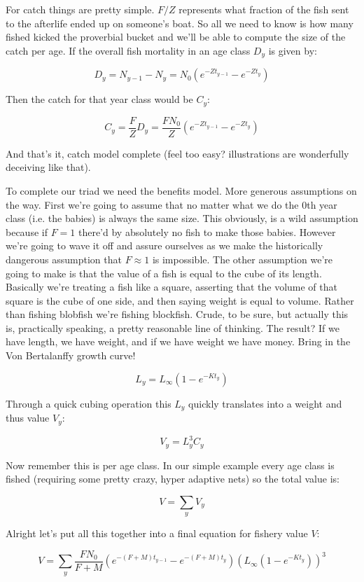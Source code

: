 \documentclass[11pt,a5paper]{book}
\begin{document}
For catch things are pretty simple. $F/Z$ represents what fraction of the fish sent to the afterlife ended up on someone's boat. So all we need to know is how many fished kicked the proverbial bucket and we'll be able to compute the size of the catch per age. If the overall fish mortality in an age class $D_y$ is given by:

$$D_y = N_{y-1} - N_y =N_0(e^{-Zt_{y-1}}- e^{-Zt_y})$$

Then the catch for that year class would be $C_y$:

$$C_y = \frac{F}{Z} D_y = \frac{FN_0}{Z}(e^{-Zt_{y-1}}- e^{-Zt_y})$$

And that's it, catch model complete (feel too easy? illustrations are wonderfully deceiving like that).
\newline

To complete our triad we need the benefits model. More generous assumptions on the way. First we're going to assume that no matter what we do the 0th year class (i.e. the babies) is always the same size. This obviously, is a wild assumption because if $F=1$ there'd by absolutely no fish to make those babies. However we're going to wave it off and assure ourselves as we make the historically dangerous assumption that $F\approx 1$ is impossible. The other assumption we're going to make is that the value of a fish is equal to the cube of its length. Basically we're treating a fish like a square, asserting that the volume of that square is the cube of one side, and then saying weight is equal to volume. Rather than fishing blobfish we're fishing blockfish. Crude, to be sure, but actually this is, practically speaking, a pretty reasonable line of thinking. The result? If we have length, we have weight, and if we have weight we have money. Bring in the Von Bertalanffy growth curve!

$$L_y = L_{\infty}(1-e^{-Kt_y})$$

Through a quick cubing operation this $L_y$ quickly translates into a weight and thus value $V_y$:

$$V_y = L_y^3C_y$$

Now remember this is per age class. In our simple example every age class is fished (requiring some pretty crazy, hyper adaptive nets) so the total value is:

$$V = \sum_y V_y$$

Alright let's put all this together into a final equation for fishery value $V$:

$$V = \sum_y \frac{FN_0}{F+M}(e^{-(F+M)t_{y-1}}- e^{-(F+M)t_y})(L_{\infty}(1-e^{-Kt_y}))^3$$
\end{document}
